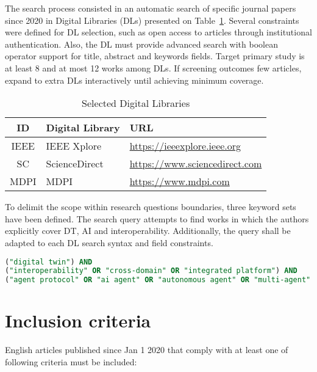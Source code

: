 The search process consisted in an automatic search of specific journal papers since 2020 in 
    Digital Libraries (DLs) presented on Table~\ref{tab:digital-library}.
Several constraints were defined for DL selection, such as
    open access to articles through institutional authentication.
Also, the DL must provide advanced search with boolean operator support for 
    title, abstract and keywords fields.
Target primary study is at least 8 and at most 12 works among DLs.
If screening outcomes few articles, expand to extra DLs interactively until
    achieving minimum coverage.

\begin{table}[H]
    \centering
    \caption{Selected Digital Libraries}
    \label{tab:digital-library}
    \begin{tabular}{c | l | l}
        \textbf{ID} & \textbf{Digital Library} & \textbf{URL} \\
        \hline
        IEEE & IEEE Xplore   & \url{https://ieeexplore.ieee.org} \\
        SC   & ScienceDirect & \url{https://www.sciencedirect.com} \\
        MDPI & MDPI          & \url{https://www.mdpi.com} \\
    \end{tabular}
\end{table}

To delimit the scope within research questions boundaries, three keyword sets have been defined.
The search query attempts to find works in which the authors explicitly cover DT, AI and interoperability.
Additionally, the query shall be adapted to each DL search syntax and field constraints.

\begin{lstlisting}[language=SQL, label=lst:search-query, caption=Search Query Structure, basicstyle=\ttfamily\small, breaklines, breakatwhitespace]
("digital twin") AND 
("interoperability" OR "cross-domain" OR "integrated platform") AND 
("agent protocol" OR "ai agent" OR "autonomous agent" OR "multi-agent" OR "agent-mediated" OR "agent communication" OR "large language model" OR "llm" OR "generative ai")
\end{lstlisting}

\section{Inclusion criteria}

English articles published since Jan 1 2020 that comply with
    at least one of following criteria must be included:

